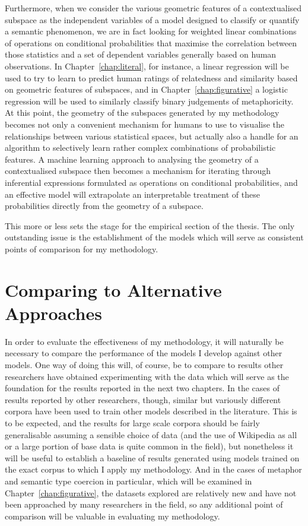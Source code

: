 Furthermore, when we consider the various geometric features of a contextualised subspace as the independent variables of a model designed to classify or quantify a semantic phenomenon, we are in fact looking for weighted linear combinations of operations on conditional probabilities that maximise the correlation between those statistics and a set of dependent variables generally based on human observations.  In Chapter~\ref{chap:literal}, for instance, a linear regression will be used to try to learn to predict human ratings of relatedness and similarity based on geometric features of subspaces, and in Chapter~\ref{chap:figurative} a logistic regression will be used to similarly classify binary judgements of metaphoricity.  At this point, the geometry of the subspaces generated by my methodology becomes not only a convenient mechanism for humans to use to visualise the relationships between various statistical spaces, but actually also a handle for an algorithm to selectively learn rather complex combinations of probabilistic features.  A machine learning approach to analysing the geometry of a contextualised subspace then becomes a mechanism for iterating through inferential expressions formulated as operations on conditional probabilities, and an effective model will extrapolate an interpretable treatment of these probabilities directly from the geometry of a subspace.

This more or less sets the stage for the empirical section of the thesis.  The only outstanding issue is the establishment of the models which will serve as consistent points of comparison for my methodology.

\section{Comparing to Alternative Approaches}
In order to evaluate the effectiveness of my methodology, it will naturally be necessary to compare the performance of the models I develop against other models.  One way of doing this will, of course, be to compare to results other researchers have obtained experimenting with the data which will serve as the foundation for the results reported in the next two chapters.  In the cases of results reported by other researchers, though, similar but variously different corpora have been used to train other models described in the literature.  This is to be expected, and the results for large scale corpora should be fairly generalisable assuming a sensible choice of data (and the use of Wikipedia as all or a large portion of base data is quite common in the field), but nonetheless it will be useful to establish a baseline of results generated using models trained on the exact corpus to which I apply my methodology.  And in the cases of metaphor and semantic type coercion in particular, which will be examined in Chapter~\ref{chap:figurative}, the datasets explored are relatively new and have not been approached by many researchers in the field, so any additional point of comparison will be valuable in evaluating my methodology.

